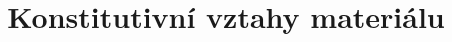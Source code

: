 \documentclass[a4paper, 10pt, draft]{report}
\begin{document}
\begin{titlepage}
\title{Konstitutivní vztahy materiálu}
\maketitle
\end{titlepage}
\end{document}
